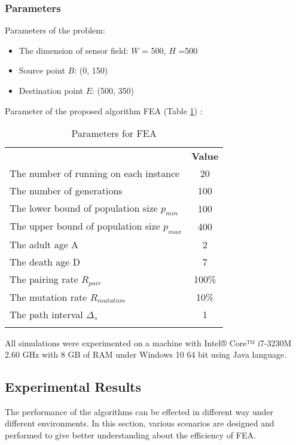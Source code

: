 \documentclass[final]{elsarticle}
\begin{document}
\subsubsection{Parameters}
Parameters of the problem:
\begin{itemize}
	\item The dimension of sensor field: $ W $ = 500, $ H $ =500
	\item Source point $ B $: (0, 150) 
	\item Destination point $ E $: (500, 350)	
\end{itemize}
Parameter of the proposed algorithm FEA (Table \ref{tab1}) :
\begin{table}
	\caption{Parameters for FEA}
	\label{tab1}       %
	\begin{center}
		\renewcommand{\arraystretch}{1.5}
		\begin{tabular}{lc}
			\hline\noalign{\smallskip}
			\multicolumn{1}{c}{\textbf{Parameter}} & \textbf{Value} \\
			\noalign{\smallskip}\hline\noalign{\smallskip}
			The number of running on each instance & 20 \\
			The number of generations & 100\\
			The lower bound of population size $ p_{min} $ & 100\\
			The upper bound of population size $ p_{max} $ & 400\\
			The adult age A & 2 \\
			The death age D & 7 \\
			The pairing rate $ R_{pair}$  & 100\% \\
			The mutation rate $ R_{mutation} $ & 10\% \\
			The path interval $\Delta_s$ & 1 \\ 
			\noalign{\smallskip} \hline
		\end{tabular}
	\end{center}
\end{table}
All simulations were experimented on a machine with Intel® Core™ i7-3230M 2.60 GHz with 8 GB of RAM under Windows 10 64 bit using Java language.


\subsection{Experimental Results}
The performance of the algorithms can be effected in different way under different environments. In this section, various scenarios are designed and performed to give better understanding about the efficiency of FEA.
\end{document}
